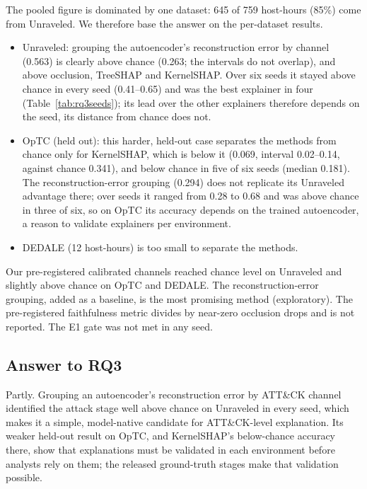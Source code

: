 \documentclass[acmlarge,screen,review]{acmart}
\begin{document}
The pooled figure is dominated by one dataset: 645 of 759 host-hours (85\%) come from Unraveled. We therefore base
the answer on the per-dataset results.
\begin{itemize}
\item Unraveled: grouping the autoencoder's reconstruction error by channel (0.563) is clearly above chance
(0.263; the intervals do not overlap), and above occlusion, TreeSHAP and KernelSHAP. Over six seeds it stayed above
chance in every seed (0.41--0.65) and was the best explainer in four (Table~\ref{tab:rq3seeds}); its lead over the
other explainers therefore depends on the seed, its distance from chance does not.
\item OpTC (held out): this harder, held-out case separates the methods from chance only for KernelSHAP, which
is below it (0.069, interval 0.02--0.14, against chance 0.341), and below chance in five of six seeds (median 0.181). The
reconstruction-error grouping (0.294) does not replicate its Unraveled advantage there; over seeds it ranged from 0.28
to 0.68 and was above chance in three of six, so on OpTC its accuracy depends on the trained autoencoder, a
reason to validate explainers per environment.
\item DEDALE (12 host-hours) is too small to separate the methods.
\end{itemize}
Our pre-registered calibrated channels reached chance level on Unraveled and slightly above chance on OpTC and
DEDALE. The reconstruction-error grouping, added as a baseline, is the most promising method (exploratory). The
pre-registered faithfulness metric divides by near-zero occlusion drops and is not reported. The E1 gate was not met
in any seed.

\subsection{Answer to RQ3}
Partly. Grouping an autoencoder's reconstruction error by ATT\&CK channel identified the attack stage well above
chance on Unraveled in every seed, which makes it a simple, model-native candidate for ATT\&CK-level explanation. Its
weaker held-out result on OpTC, and KernelSHAP's below-chance accuracy there, show that explanations must be validated
in each environment before analysts rely on them; the released ground-truth stages make that validation possible.
\end{document}
